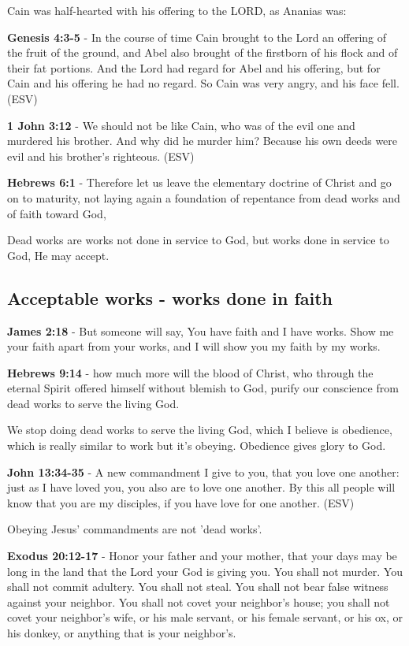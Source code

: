 \documentclass[11pt]{article}
\begin{document}
Cain was half-hearted with his offering to the LORD, as Ananias was:

\textbf{Genesis 4:3-5} - In the course of time Cain brought to the Lord an offering of the fruit of the ground, and Abel also brought of the firstborn of his flock and of their fat portions. And the Lord had regard for Abel and his offering, but for Cain and his offering he had no regard. So Cain was very angry, and his face fell. (ESV)

\textbf{1 John 3:12} - We should not be like Cain, who was of the evil one and murdered his brother. And why did he murder him? Because his own deeds were evil and his brother's righteous. (ESV)

\textbf{Hebrews 6:1} - Therefore let us leave the elementary doctrine of Christ and go on to maturity, not laying again a foundation of repentance from dead works and of faith toward God,

Dead works are works not done in service to God, but works done in service to God, He may accept.

\subsection{Acceptable works - works done in faith}
\label{sec:org73f49b0}
\textbf{James 2:18} - But someone will say, You have faith and I have works. Show me your faith apart from your works, and I will show you my faith by my works.

\textbf{Hebrews 9:14} - how much more will the blood of Christ, who through the eternal Spirit offered himself without blemish to God, purify our conscience from dead works to serve the living God.

We stop doing dead works to serve the living God, which I believe is obedience,
which is really similar to work but it's obeying. Obedience gives glory to God.

\textbf{John 13:34-35} - A new commandment I give to you, that you love one another: just as I have loved you, you also are to love one another. By this all people will know that you are my disciples, if you have love for one another. (ESV)

Obeying Jesus' commandments are not 'dead works'.

\textbf{Exodus 20:12-17} - Honor your father and your mother, that your days may be long in the land that the Lord your God is giving you. You shall not murder. You shall not commit adultery. You shall not steal. You shall not bear false witness against your neighbor. You shall not covet your neighbor's house; you shall not covet your neighbor's wife, or his male servant, or his female servant, or his ox, or his donkey, or anything that is your neighbor's.
\end{document}
